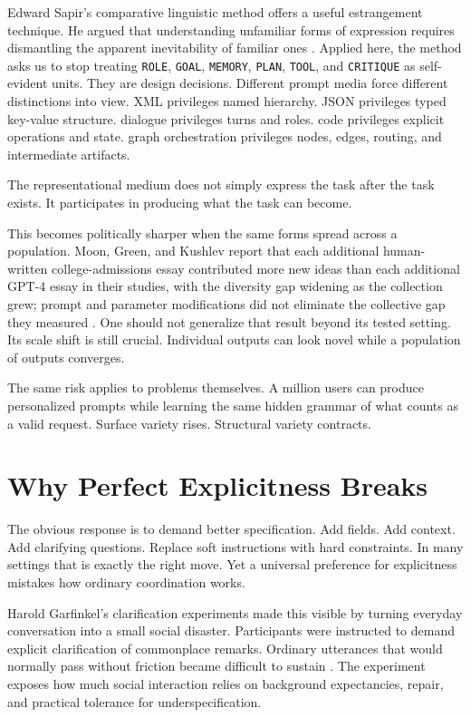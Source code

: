 \documentclass[11pt]{article}
\begin{document}
Edward Sapir's comparative linguistic method offers a useful estrangement technique. He argued that understanding unfamiliar forms of expression requires dismantling the apparent inevitability of familiar ones \citep{sapir1921language}. Applied here, the method asks us to stop treating \texttt{ROLE}, \texttt{GOAL}, \texttt{MEMORY}, \texttt{PLAN}, \texttt{TOOL}, and \texttt{CRITIQUE} as self-evident units. They are design decisions. Different prompt media force different distinctions into view. XML privileges named hierarchy. JSON privileges typed key-value structure. dialogue privileges turns and roles. code privileges explicit operations and state. graph orchestration privileges nodes, edges, routing, and intermediate artifacts.

The representational medium does not simply express the task after the task exists. It participates in producing what the task can become.

This becomes politically sharper when the same forms spread across a population. Moon, Green, and Kushlev report that each additional human-written college-admissions essay contributed more new ideas than each additional GPT-4 essay in their studies, with the diversity gap widening as the collection grew; prompt and parameter modifications did not eliminate the collective gap they measured \citep{moon2025homogenizing}. One should not generalize that result beyond its tested setting. Its scale shift is still crucial. Individual outputs can look novel while a population of outputs converges.

The same risk applies to problems themselves. A million users can produce personalized prompts while learning the same hidden grammar of what counts as a valid request. Surface variety rises. Structural variety contracts.

\section{Why Perfect Explicitness Breaks}

The obvious response is to demand better specification. Add fields. Add context. Add clarifying questions. Replace soft instructions with hard constraints. In many settings that is exactly the right move. Yet a universal preference for explicitness mistakes how ordinary coordination works.

Harold Garfinkel's clarification experiments made this visible by turning everyday conversation into a small social disaster. Participants were instructed to demand explicit clarification of commonplace remarks. Ordinary utterances that would normally pass without friction became difficult to sustain \citep{garfinkel1967studies}. The experiment exposes how much social interaction relies on background expectancies, repair, and practical tolerance for underspecification.
\end{document}
